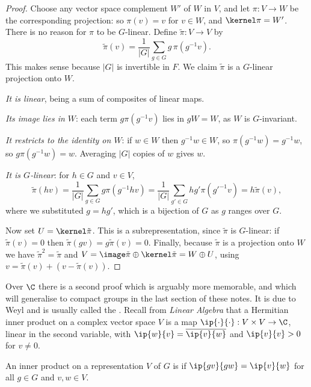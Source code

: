 \begin{proof}
	Choose any vector space complement $W'$ of $W$ in $V$, and let $\pi : V \to W$ be the corresponding projection: so $\pi(v) = v$ for $v \in W$, and $\kernel \pi = W'$. There is no reason for $\pi$ to be $G$-linear. Define $\tilde\pi : V \to V$ by
	$$\tilde{\pi}(v) = \frac{1}{|G|}\sum_{g \in G} g\, \pi(g^{-1} v).$$
	This makes sense because $|G|$ is invertible in $F$. We claim $\tilde\pi$ is a $G$-linear projection onto $W$.

	\emph{It is linear}, being a sum of composites of linear maps.

	\emph{Its image lies in $W$}: each term $g \pi(g^{-1}v)$ lies in $gW = W$, as $W$ is $G$-invariant.

	\emph{It restricts to the identity on $W$}: if $w \in W$ then $g^{-1}w \in W$, so $\pi(g^{-1}w) = g^{-1}w$, so $g\pi(g^{-1}w) = w$. Averaging $|G|$ copies of $w$ gives $w$.

	\emph{It is $G$-linear}: for $h \in G$ and $v \in V$,
	$$\tilde\pi(hv) = \frac{1}{|G|}\sum_{g \in G} g \pi(g^{-1}hv) = \frac{1}{|G|}\sum_{g' \in G} h g' \pi(g'^{-1}v) = h \tilde\pi(v),$$
	where we substituted $g = hg'$, which is a bijection of $G$ as $g$ ranges over $G$.

	Now set $U = \kernel \tilde{\pi}$. This is a subrepresentation, since $\tilde\pi$ is $G$-linear: if $\tilde\pi(v) = 0$ then $\tilde\pi(gv) = g\tilde\pi(v) = 0$. Finally, because $\tilde\pi$ is a projection onto $W$ we have $\tilde\pi^2 = \tilde\pi$ and $V = \image \tilde\pi \oplus \kernel \tilde\pi = W \oplus U$, using $v = \tilde\pi(v) + (v - \tilde\pi(v))$.
\end{proof}

Over $\C$ there is a second proof which is arguably more memorable, and which will generalise to compact groups in the last section of these notes. It is due to Weyl and is usually called the . Recall from \emph{Linear Algebra} that a Hermitian inner product on a complex vector space $V$ is a map $\ip{\cdot}{\cdot} : V\times V \to \C$, linear in the second variable, with $\ip{w}{v} = \overline{\ip{v}{w}}$ and $\ip{v}{v} > 0$ for $v \neq 0$.

\begin{definition}
	An inner product on a representation $V$ of $G$ is  if $\ip{gv}{gw} = \ip{v}{w}$ for all $g \in G$ and $v, w \in V$.
\end{definition}

